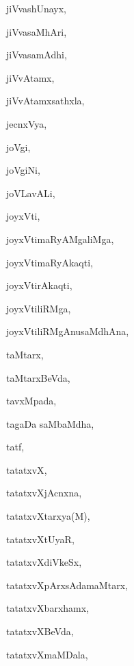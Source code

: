 \begin{multicols}{3}
{\noindent
{jiVvashUnayx}, \pageref{jiVvashUnayx}

\noindent
{jiVvasaMhAri}, \pageref{jiVvasaMhAri}

\noindent
{jiVvasamAdhi}, \pageref{jiVvasamAdhi}

\noindent
{jiVvAtamx}, \pageref{jiVvAtamx}

\noindent
{jiVvAtamxsathxla}, \pageref{jiVvAtamxsathxla}

\noindent
{jecnxVya}, \pageref{jecnxVya}

\noindent
{joVgi}, \pageref{joVgi}

\noindent
{joVgiNi}, \pageref{joVgiNi}

\noindent
{joVLavALi}, \pageref{joVLavALi}

\noindent
{joyxVti}, \pageref{joyxVti}

\noindent
{joyxVtimaRyAMgaliMga}, \pageref{joyxVtimaRyAMgaliMga}

\noindent
{joyxVtimaRyAkaqti}, \pageref{joyxVtimaRyAkaqti}

\noindent
{joyxVtirAkaqti}, \pageref{joyxVtirAkaqti}

\noindent
{joyxVtiliRMga}, \pageref{joyxVtiliRMga}

\noindent
{joyxVtiliRMgAnusaMdhAna}, \pageref{joyxVtiliRMgAnusaMdhAna}

\noindent
{taMtarx}, \pageref{taMtarx}

\noindent
{taMtarxBeVda}, \pageref{taMtarxBeVda}

\noindent
{tavxMpada}, \pageref{tavxMpada}

\noindent
{tagaDa saMbaMdha}, \pageref{tagaDa saMbaMdha}

\noindent
{tatf}, \pageref{tatf}

\noindent
{tatatxvX}, \pageref{tatatxvX}

\noindent
{tatatxvXjAcnxna}, \pageref{tatatxvXjAcnxna}

\noindent
{tatatxvXtarxya(M)}, \pageref{tatatxvXtarxya(M)}

\noindent
{tatatxvXtUyaR}, \pageref{tatatxvXtUyaR}

\noindent
{tatatxvXdiVkeSx}, \pageref{tatatxvXdiVkeSx}

\noindent
{tatatxvXpArxsAdamaMtarx}, \pageref{tatatxvXpArxsAdamaMtarx}

\noindent
{tatatxvXbarxhamx}, \pageref{tatatxvXbarxhamx}

\noindent
{tatatxvXBeVda}, \pageref{tatatxvXBeVda}

\noindent
{tatatxvXmaMDala}, \pageref{tatatxvXmaMDala}

}
\end{multicols}
